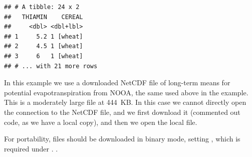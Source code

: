 \documentclass[krantz2]{krantz}\usepackage{knitr}
\begin{document}
\begin{knitrout}\footnotesize
{}\color{fgcolor}\begin{kframe}
\begin{alltt}
 \hlkwb{<-}
    \hlstd{(} \hlstd{=} \hlstd{)}
\end{alltt}
\begin{verbatim}
## # A tibble: 24 x 2
##   THIAMIN    CEREAL
##     <dbl> <dbl+lbl>
## 1     5.2 1 [wheat]
## 2     4.5 1 [wheat]
## 3     6   1 [wheat]
## # ... with 21 more rows
\end{verbatim}
\end{kframe}
\end{knitrout}

In this example we use a downloaded NetCDF file of long-term means for potential evapotranspiration from NOOA, the same used above in the  example. This is a moderately large file at 444~KB. In this case we cannot directly open the connection to the NetCDF file, and we first download it (commented out code, as we have a local copy), and then we open the local file.

\begin{knitrout}\footnotesize
{}\color{fgcolor}\begin{kframe}
\begin{alltt}
 \hlkwb{<-} \hlstd{(}\hlstd{,}
                \hlstd{,}
                 \hlstd{=} \hlstd{)}
 \hlkwb{<-} \hlstd{(}\hlstd{)}
\end{alltt}
\end{kframe}
\end{knitrout}

\begin{warningbox}
For portability,  files should be downloaded in binary mode, setting , which is required under .
.
\end{warningbox}
\end{document}
